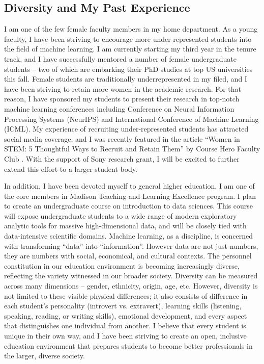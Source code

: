 \documentclass[10pt]{article}
\theoremstyle{definition}
\theoremstyle{definition}
\theoremstyle{definition}
\begin{document}
\begin{enumerate}
\subsection{Diversity and My Past Experience}
I am one of the few female faculty members in my home department. As a young faculty, I have been striving to encourage more under-represented students into the field of machine learning. I am currently starting my third year in the tenure track, and I have successfully mentored a number of female undergraduate students -- two of which are embarking their PhD studies at top US universities this fall. Female students are traditionally underrepresented in my filed, and I have been striving to retain more women in the academic research. For that reason, I have sponsored my students to present their research in top-notch machine learning conferences including Conference on Neural Information Processing Systems (NeurIPS) and International Conference of Machine Learning (ICML). My experience of recruiting under-represented students has attracted social media coverage, and I was recently featured in the article ``Women in STEM: 5 Thoughtful Ways to Recruit and Retain Them'' by Course Hero Faculty Club . With the support of Sony research grant, I will be excited to further extend this effort to a larger student body. 


In addition, I have been devoted myself to general higher education. I am one of the core members in Madison Teaching and Learning Excellence program. I plan to create an undergraduate course on introduction to data sciences. This course will expose undergraduate students to a wide range of modern exploratory analytic tools for massive high-dimensional data, and will be closely tied with data-intensive scientific domains. Machine learning, as a discipline, is concerned with transforming “data” into “information”. However data are not just numbers, they are numbers with social, economical, and cultural contexts. The personnel constitution in our education environment is becoming increasingly diverse, reflecting the variety witnessed in our broader society. Diversity can be measured across many dimensions – gender, ethnicity, origin, age, etc. However, diversity is not limited to these visible physical differences; it also consists of difference in each student’s personality (introvert vs. extravert), learning skills (listening, speaking, reading, or writing skills), emotional development, and every aspect that distinguishes one individual from another. I believe that every student is unique in their own way, and I have been striving to create an open, inclusive education environment that prepares students to become better professionals in the larger, diverse society.


\end{enumerate}
\end{document}
